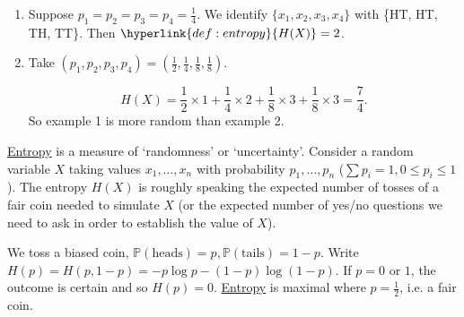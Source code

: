 \documentclass{article}
\newcommand{\Prob}{\mathbb{P}}
\newcommand{\1}[1]{\mathbbm{1}_{#1}}
\begin{document}
\begin{eg}
    \leavevmode
    \begin{enumerate}[label=\arabic*.]
        \item Suppose $p_1 = p_2 = p_3 = p_4 = \frac{1}{4}$.
            We identify $\{x_1, x_2, x_3, x_4\}$ with \{HT, HT, TH, TT\}. Then $\hyperlink{def:entropy}{H(X)} = 2$.
        \item Take $(p_1, p_2, p_3, p_4) = (\frac{1}{2}, \frac{1}{4}, \frac{1}{8}, \frac{1}{8})$.
            \begin{center}
            \end{center}
            \begin{equation*}
                H(X) = \frac{1}{2} \times 1 + \frac{1}{4} \times 2 + \frac{1}{8} \times 3 + \frac{1}{8} \times 3 = \frac{7}{4}.
            \end{equation*}
            So example 1 is more random than example 2.
    \end{enumerate}
\end{eg}

\hyperlink{def:entropy}{Entropy} is a measure of `randomness' or `uncertainty'.
Consider a random variable $X$ taking values $x_1, \dotsc, x_n$ with probability $p_1, \dotsc, p_n$ ($\sum p_i = 1, 0 \leq p_i \leq 1$).
The entropy $H(X)$ is roughly speaking the expected number of tosses of a fair coin needed to simulate $X$ (or the expected number of yes/no questions we need to ask in order to establish the value of $X$).

\begin{eg}
    We toss a biased coin, $\Prob(\text{heads}) = p, \Prob(\text{tails}) = 1-p$. Write $H(p) = H(p, 1-p) = -p \log p - (1-p) \log (1-p)$.
    If $p=0$ or $1$, the outcome is certain and so $H(p)=0$. \hyperlink{def:entropy}{Entropy} is maximal where $p=\frac{1}{2}$, i.e. a fair coin.

    \begin{center}
    \end{center}
\end{eg}
\end{document}
